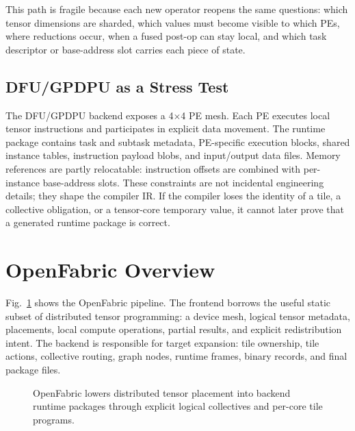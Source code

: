 \documentclass[conference]{IEEEtran}
\newcommand{\systemname}{OpenFabric}
\newcommand{\targetbackend}{DFU/GPDPU}
\newcommand{\meshsize}{4$\times$4}
\begin{document}
This path is fragile because each new operator reopens the same questions: which
tensor dimensions are sharded, which values must become visible to which PEs,
where reductions occur, when a fused post-op can stay local, and which task
descriptor or base-address slot carries each piece of state.

\subsection{DFU/GPDPU as a Stress Test}

The \targetbackend{} backend exposes a \meshsize{} PE mesh. Each PE executes
local tensor instructions and participates in explicit data movement. The
runtime package contains task and subtask metadata, PE-specific execution blocks,
shared instance tables, instruction payload blobs, and input/output data files.
Memory references are partly relocatable: instruction offsets are combined with
per-instance base-address slots. These constraints are not incidental
engineering details; they shape the compiler IR. If the compiler loses the
identity of a tile, a collective obligation, or a tensor-core temporary value,
it cannot later prove that a generated runtime package is correct.

\section{\systemname{} Overview}

Fig.~\ref{fig:pipeline} shows the \systemname{} pipeline. The frontend borrows
the useful static subset of distributed tensor programming: a device mesh,
logical tensor metadata, placements, local compute operations, partial results,
and explicit redistribution intent. The backend is responsible for target
expansion: tile ownership, tile actions, collective routing, graph nodes,
runtime frames, binary records, and final package files.

\begin{figure}[t]
\centering
{}
\caption{\systemname{} lowers distributed tensor placement into backend runtime
packages through explicit logical collectives and per-core tile programs.}
\label{fig:pipeline}
\end{figure}
\end{document}
